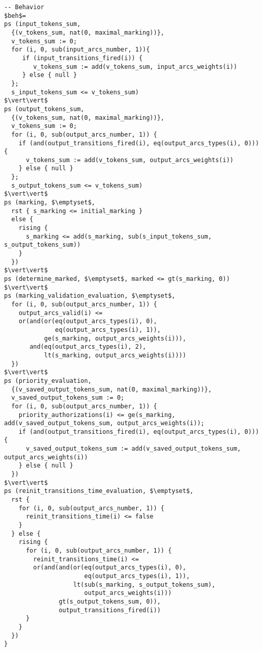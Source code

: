 \begin{lstlisting}
-- Behavior  
$beh$=
ps (input_tokens_sum, 
  {(v_tokens_sum, nat(0, maximal_marking))},
  v_tokens_sum := 0;
  for (i, 0, sub(input_arcs_number, 1)){
     if (input_transitions_fired(i)) { 
        v_tokens_sum := add(v_tokens_sum, input_arcs_weights(i))
     } else { null }
  };
  s_input_tokens_sum <= v_tokens_sum)
$\vert\vert$
ps (output_tokens_sum, 
  {(v_tokens_sum, nat(0, maximal_marking))},
  v_tokens_sum := 0;
  for (i, 0, sub(output_arcs_number, 1)) {
    if (and(output_transitions_fired(i), eq(output_arcs_types(i), 0))) {
      v_tokens_sum := add(v_tokens_sum, output_arcs_weights(i))
    } else { null }
  };
  s_output_tokens_sum <= v_tokens_sum)
$\vert\vert$    
ps (marking, $\emptyset$,
  rst { s_marking <= initial_marking }
  else {
    rising {
      s_marking <= add(s_marking, sub(s_input_tokens_sum, s_output_tokens_sum))
    }
  })
$\vert\vert$
ps (determine_marked, $\emptyset$, marked <= gt(s_marking, 0))
$\vert\vert$  
ps (marking_validation_evaluation, $\emptyset$,
  for (i, 0, sub(output_arcs_number, 1)) {
    output_arcs_valid(i) <= 
    or(and(or(eq(output_arcs_types(i), 0),
              eq(output_arcs_types(i), 1)),
           ge(s_marking, output_arcs_weights(i))),
       and(eq(output_arcs_types(i), 2),
           lt(s_marking, output_arcs_weights(i))))
  })
$\vert\vert$
ps (priority_evaluation, 
  {(v_saved_output_tokens_sum, nat(0, maximal_marking))},
  v_saved_output_tokens_sum := 0;
  for (i, 0, sub(output_arcs_number, 1)) {
    priority_authorizations(i) <= ge(s_marking, add(v_saved_output_tokens_sum, output_arcs_weights(i));
    if (and(output_transitions_fired(i), eq(output_arcs_types(i), 0))) {
      v_saved_output_tokens_sum := add(v_saved_output_tokens_sum, output_arcs_weights(i))
    } else { null }
  })
$\vert\vert$      
ps (reinit_transitions_time_evaluation, $\emptyset$,
  rst { 
    for (i, 0, sub(output_arcs_number, 1)) {
      reinit_transitions_time(i) <= false
    }
  } else {
    rising {
      for (i, 0, sub(output_arcs_number, 1)) {
        reinit_transitions_time(i) <=
        or(and(and(or(eq(output_arcs_types(i), 0),
                      eq(output_arcs_types(i), 1)),
                   lt(sub(s_marking, s_output_tokens_sum),
                      output_arcs_weights(i)))
               gt(s_output_tokens_sum, 0)),
               output_transitions_fired(i))
      }
    }
  })
}
\end{lstlisting}

